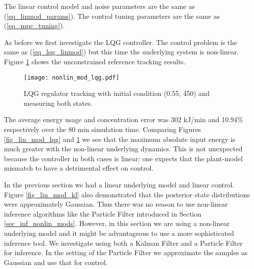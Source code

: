 The linear control model and noise parameters are the same as (\ref{eq_linmod_params}). The control tuning parameters are the same as (\ref{eq_mpc_tuning}).

As before we first investigate the LQG controller. The control problem is the same as (\ref{eq_lqg_linmod}) but this time the underlying system is non-linear. Figure \ref{fig_nonlin_lqg} shows the unconstrained reference tracking results.
\begin{figure}[H] 
\centering
\texttt{[image: nonlin\_mod\_lqg.pdf]}
\caption{LQG regulator tracking with initial condition (0.55, 450) and measuring both states.}
\label{fig_nonlin_lqg}
\end{figure}
The average energy usage and concentration error was 302 kJ/min and 10.94\% respectively over the 80 min simulation time. Comparing Figures \ref{fig_lin_mod_lqg} and \ref{fig_nonlin_lqg} we see that the maximum absolute input energy is much greater with the non-linear underlying dynamics. This is not unexpected because the controller in both cases is linear: one expects that the plant-model mismatch to have a detrimental effect on control.

In the previous section we had a linear underlying model and linear control. Figure \ref{fig_lin_mod_kl} also demonstrated that the posterior state distributions were approximately Gaussian. Thus there was no reason to use non-linear inference algorithms like the Particle Filter introduced in Section \ref{sec_inf_nonlin_mods}. However, in this section we are using a non-linear underlying model and it might be advantageous to use a more sophisticated inference tool. We investigate using both a Kalman Filter and a Particle Filter for inference. In the setting of the Particle Filter we approximate the samples as Gaussian and use that for control.

